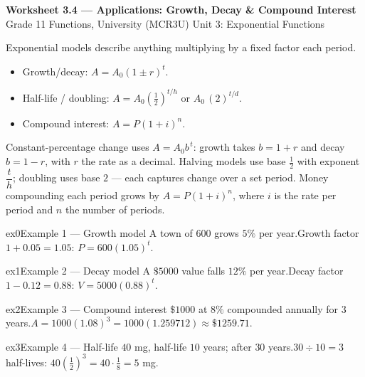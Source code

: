 \documentclass[11pt]{article}
\begin{document}
\begin{center}
{\LARGE\bfseries\color{titleblue}Worksheet 3.4 --- Applications: Growth, Decay \& Compound Interest}\\[2pt]
{\small Grade 11 Functions, University (MCR3U) \textperiodcentered{} Unit 3: Exponential Functions}
\end{center}

\begin{ideabox}
Exponential models describe anything multiplying by a fixed factor each period.
\begin{itemize}[leftmargin=*,itemsep=2pt]
  \item Growth/decay: $A=A_0(1\pm r)^{t}$.
  \item Half-life / doubling: $A=A_0\left(\tfrac12\right)^{t/h}$ or $A_0\,(2)^{t/d}$.
  \item Compound interest: $A=P(1+i)^{n}$.
\end{itemize}
\end{ideabox}

\begin{learnbox}
Constant-percentage change uses $A=A_0 b^{\,t}$: growth takes $b=1+r$ and decay $b=1-r$, with $r$ the rate as a decimal.
Halving models use base $\tfrac12$ with exponent $\dfrac{t}{h}$; doubling uses base $2$ — each captures change over a set period.
Money compounding each period grows by $A=P(1+i)^n$, where $i$ is the rate per period and $n$ the number of periods.
\end{learnbox}


\begin{example}{ex0}{Example 1 --- Growth model}
A town of $600$ grows $5\%$ per year.\soln Growth factor $1+0.05=1.05$: $P=600(1.05)^{t}$.
\end{example}

\begin{example}{ex1}{Example 2 --- Decay model}
A $\$5000$ value falls $12\%$ per year.\soln Decay factor $1-0.12=0.88$: $V=5000(0.88)^{t}$.
\end{example}

\begin{example}{ex2}{Example 3 --- Compound interest}
$\$1000$ at $8\%$ compounded annually for $3$ years.\soln $A=1000(1.08)^{3}=1000(1.259712)\approx\$1259.71$.
\end{example}

\begin{example}{ex3}{Example 4 --- Half-life}
$40$ mg, half-life $10$ years; after $30$ years.\soln $30\div10=3$ half-lives: $40\left(\tfrac12\right)^{3}=40\cdot\tfrac18=5$ mg.
\end{example}
\end{document}
